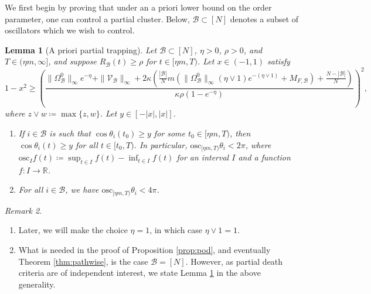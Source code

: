 \documentclass[11pt,reqno]{amsart}
\newcommand{\R}{\mathbb{R}}
\newtheorem{lemma}{Lemma}[section]
\theoremstyle{definition}
\theoremstyle{remark}
\newtheorem{remark}[lemma]{Remark}
\begin{document}
We first begin by proving that under an a priori lower bound on the order parameter, one can control a partial cluster. Below, $\mathcal{B}\subset [N]$ denotes a subset of oscillators which we wish to control.


\begin{lemma}[A priori partial trapping]\label{lem:single}
Let $\mathcal{B}\subset [N]$, $\eta>0$, $\rho>0$, and $T\in (\eta m,\infty]$, and suppose $R_\mathcal{B}(t)\ge\rho$ for
$t\in[\eta m,T)$. Let $x\in (-1,1)$ satisfy
\begin{equation}\label{eq:xbound}
1-x^2\ge\left(\frac{\|\Omega_\mathcal{B}^0\|_\infty e^{-\eta}+\|\mathcal V_\mathcal{B}\|_\infty+2\kappa\left(\frac{|\mathcal{B}|}{N}m\left(\|\Omega_\mathcal{B}^0\|_\infty(\eta\vee 1)e^{-(\eta\vee 1)}+ M_{F,\mathcal{B}}\right)+\frac{N-|\mathcal{B}|}{N}\right)}{\kappa\rho(1-e^{-\eta})}\right)^{\!2},
\end{equation}
where $z\vee w\coloneqq \max\{z,w\}$.
Let $y\in[-|x|,|x|]$.
\begin{enumerate}
\item If $i\in \mathcal{B}$ is such that $\cos\theta_i(t_0)\ge y$ for
some $t_0\in[\eta m,T)$, then $\cos\theta_i(t)\ge y$ for all
$t\in[t_0,T)$. In particular, $\mathrm{osc}_{[\eta m,T)} \theta_i<2\pi$, where $\mathrm{osc}_{I}f(t)\coloneqq \sup_{t\in I}f(t)-\inf_{t\in I} f(t)$ for an interval $I$ and a function $f:I\to \R$.
\item For all $i\in \mathcal{B}$, we have $\mathrm{osc}_{[\eta m,T)} \theta_i<4\pi$.
\end{enumerate}
\end{lemma}
\begin{remark}\,
\begin{enumerate}
\item Later, we will make the choice $\eta=1$, in which case $\eta\vee 1=1$.
\item What is needed in the proof of Proposition \ref{prop:pod}, and eventually Theorem \ref{thm:pathwise}, is the case $\mathcal{B}=[N]$. However, as partial death criteria are of independent interest, we state Lemma \ref{lem:single} in the above generality.
\end{enumerate}

\end{remark}
\end{document}
